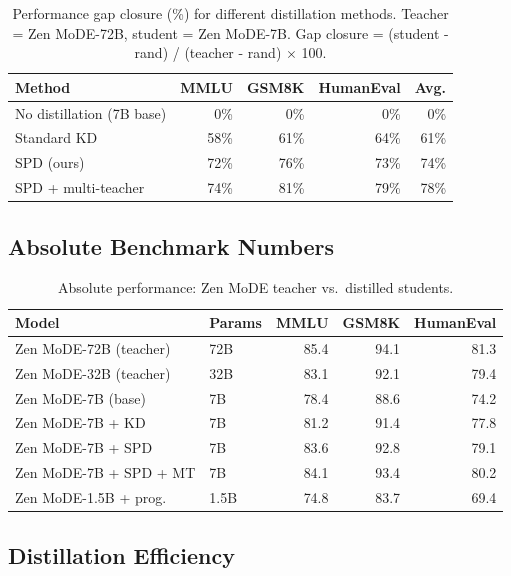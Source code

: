 \documentclass[11pt,a4paper]{article}
\begin{document}
\begin{table}[H]
\centering
\caption{Performance gap closure (\%) for different distillation methods.
Teacher = Zen MoDE-72B, student = Zen MoDE-7B.
Gap closure = (student - rand) / (teacher - rand) $\times$ 100.}
\begin{tabular}{lrrrr}
\toprule
\textbf{Method} & \textbf{MMLU} & \textbf{GSM8K} & \textbf{HumanEval} & \textbf{Avg.} \\
\midrule
No distillation (7B base) & 0\%  & 0\%  & 0\%  & 0\% \\
Standard KD               & 58\% & 61\% & 64\% & 61\% \\
SPD (ours)                & 72\% & 76\% & 73\% & 74\% \\
SPD + multi-teacher       & 74\% & 81\% & 79\% & 78\% \\
\bottomrule
\end{tabular}
\label{tab:gap_closure}
\end{table}

\subsection{Absolute Benchmark Numbers}

\begin{table}[H]
\centering
\caption{Absolute performance: Zen MoDE teacher vs.\ distilled students.}
\begin{tabular}{llrrr}
\toprule
\textbf{Model} & \textbf{Params} & \textbf{MMLU} & \textbf{GSM8K} & \textbf{HumanEval} \\
\midrule
Zen MoDE-72B (teacher) & 72B & 85.4 & 94.1 & 81.3 \\
Zen MoDE-32B (teacher) & 32B & 83.1 & 92.1 & 79.4 \\
Zen MoDE-7B (base)     & 7B  & 78.4 & 88.6 & 74.2 \\
Zen MoDE-7B + KD       & 7B  & 81.2 & 91.4 & 77.8 \\
Zen MoDE-7B + SPD      & 7B  & 83.6 & 92.8 & 79.1 \\
Zen MoDE-7B + SPD + MT & 7B  & 84.1 & 93.4 & 80.2 \\
Zen MoDE-1.5B + prog.  & 1.5B & 74.8 & 83.7 & 69.4 \\
\bottomrule
\end{tabular}
\label{tab:absolute}
\end{table}

\subsection{Distillation Efficiency}
\end{document}
